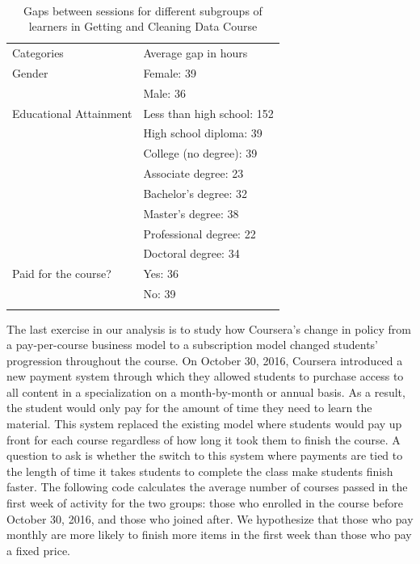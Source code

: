 \begin{table}
\footnotesize
\caption{Gaps between sessions for different subgroups of learners in Getting and Cleaning Data Course}\
\centering
\label{tab:timecats}
\begin{tabular}{p{3cm}|p{4cm}}
Categories & Average gap in hours \\
\addlinespace
\toprule
Gender & Female: 39\\
       & Male: 36\\
\midrule
Educational Attainment & Less than high school: 152\\
           & High school diploma: 39\\
           & College (no degree): 39\\
           & Associate degree: 23\\
           & Bachelor's degree: 32\\
           & Master's degree: 38\\
           & Professional degree: 22\\
           & Doctoral degree: 34\\
\midrule
Paid for the course? & Yes: 36\\
           & No: 39\\
\addlinespace
\bottomrule
\end{tabular}
\end{table}

The last exercise in our analysis is to study how Coursera's change in
policy from a pay-per-course business model to a subscription model
changed students' progression throughout the course. On October 30,
2016, Coursera introduced a new payment system through which they
allowed students to purchase access to all content in a specialization
on a month-by-month or annual basis. As a result, the student would only
pay for the amount of time they need to learn the material. This system
replaced the existing model where students would pay up front for each
course regardless of how long it took them to finish the course. A
question to ask is whether the switch to this system where payments are
tied to the length of time it takes students to complete the class make
students finish faster. The following code calculates the average number
of courses passed in the first week of activity for the two groups:
those who enrolled in the course before October 30, 2016, and those who
joined after. We hypothesize that those who pay monthly are more likely
to finish more items in the first week than those who pay a fixed price.

